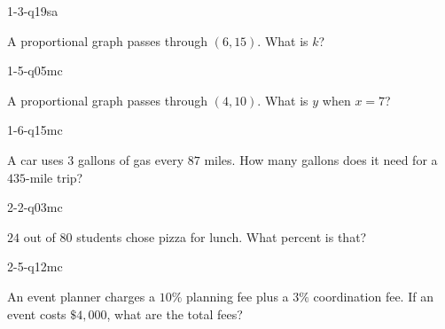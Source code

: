 
\begin{practiceQuestion}{1-3-q19}{sa}
\begin{questionText}
A proportional graph passes through $(6, 15)$. What is $k$?
\end{questionText}
\end{practiceQuestion}

\begin{practiceQuestion}{1-5-q05}{mc}
\begin{questionText}
A proportional graph passes through $(4, 10)$. What is $y$ when $x = 7$?
\end{questionText}
\end{practiceQuestion}

\begin{practiceQuestion}{1-6-q15}{mc}
\begin{questionText}
A car uses $3$ gallons of gas every $87$ miles. How many gallons does it need for a $435$-mile trip?
\end{questionText}
\end{practiceQuestion}

\begin{practiceQuestion}{2-2-q03}{mc}
\begin{questionText}
$24$ out of $80$ students chose pizza for lunch. What percent is that?
\end{questionText}
\end{practiceQuestion}

\begin{practiceQuestion}{2-5-q12}{mc}
\begin{questionText}
An event planner charges a $10\%$ planning fee plus a $3\%$ coordination fee. If an event costs $\$4{,}000$, what are the total fees?
\end{questionText}
\end{practiceQuestion}

